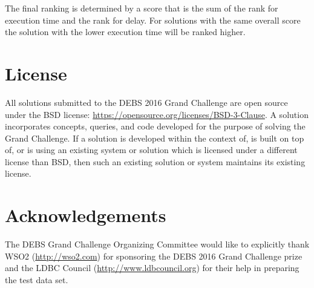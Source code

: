 \documentclass{sig-alternate}
\begin{document}
The final ranking is determined by a score that is the sum of the rank for execution time and the rank for delay. For solutions with the same overall score the solution with the lower execution time will be ranked higher.

\section{License}
All solutions submitted to the DEBS 2016 Grand Challenge are open source under the BSD license: \url{https://opensource.org/licenses/BSD-3-Clause}. A solution incorporates concepts, queries, and code developed for the purpose of solving the Grand Challenge. If a solution is developed within the context of, is built on top of, or is using an existing system or solution which is licensed under a different license than BSD, then such an existing solution or system maintains its existing license.

\section{Acknowledgements}
The DEBS Grand Challenge Organizing Committee would like to explicitly thank WSO2 (\url{http://wso2.com}) for sponsoring the DEBS 2016 Grand Challenge prize and the LDBC Council (\url{http://www.ldbcouncil.org}) for their help in preparing the test data set.




\end{document}
